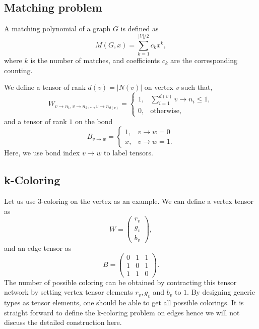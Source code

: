 \documentclass[onefignum, onetabnum]{siamart190516}
\newcommand{\<}{\langle}
\renewcommand{\>}{\rangle}
\newcounter{example}
\begin{document}
\subsection{Matching problem}
A matching polynomial of a graph $G$ is defined as
\begin{equation}
    M(G, x) = \sum\limits_{k=1}^{|V|/2} c_k x^k,
\end{equation}
where $k$ is the number of matches, and coefficients $c_k$ are the corresponding counting.

We define a tensor of rank $d(v) = |N(v)|$ on vertex $v$ such that,
\begin{equation}
    W_{v\rightarrow n_1, v\rightarrow n_2, \ldots, v\rightarrow n_{d(v)}} = \begin{cases}
        1, & \sum_{i=1}^{d(v)} v\rightarrow n_i \leq 1,\\
        0, & \text{otherwise},
    \end{cases}
\end{equation}
and a tensor of rank $1$ on the bond
\begin{equation}
    B_{v\rightarrow w} = \begin{cases}
    1, & v \rightarrow w = 0 \\
    x, & v \rightarrow w = 1.
\end{cases}
\end{equation}
Here, we use bond index $v \rightarrow w$ to label tensors.

\subsection{k-Coloring}
Let us use 3-coloring on the vertex as an example. We can define a vertex tensor as
\begin{equation}
    W = \left(\begin{matrix}
        r_v\\
        g_v\\
        b_v
    \end{matrix}\right),
\end{equation}
and an edge tensor as
\begin{equation}
    B = \left(\begin{matrix}
        0 & 1 & 1\\
        1 & 0 & 1\\
        1 & 1 & 0
    \end{matrix}\right).
\end{equation}
The number of possible coloring can be obtained by contracting this tensor network by setting vertex tensor elements $r_v, g_v$ and $b_v$ to $1$.
By designing generic types as tensor elements, one should be able to get all possible colorings.
It is straight forward to define the k-coloring problem on edges hence we will not discuss the detailed construction here.
\end{document}
